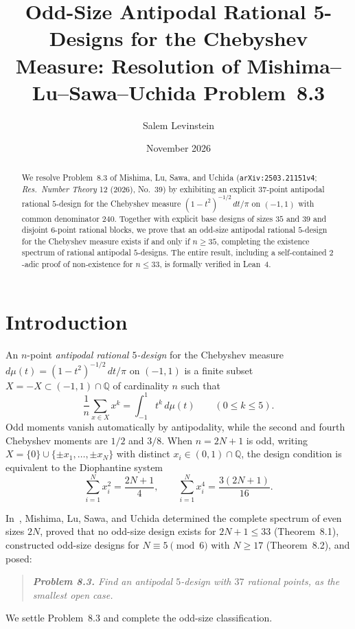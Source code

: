 \documentclass[11pt]{article}
\title{Odd-Size Antipodal Rational 5-Designs for the Chebyshev Measure: Resolution of Mishima--Lu--Sawa--Uchida Problem~8.3}
\author{Salem Levinstein}
\date{November 2026}
\begin{document}
\maketitle

\begin{abstract}
We resolve Problem~8.3 of Mishima, Lu, Sawa, and Uchida
(\texttt{arXiv:2503.21151v4}; \emph{Res.\ Number Theory} 12 (2026), No.~39) by
exhibiting an explicit $37$-point antipodal rational $5$-design for the
Chebyshev measure $(1-t^2)^{-1/2}\,dt/\pi$ on $(-1,1)$ with common denominator
$240$. Together with explicit base designs of sizes $35$ and $39$ and disjoint
$6$-point rational blocks, we prove that an odd-size antipodal rational
$5$-design for the Chebyshev measure exists if and only if $n \ge 35$,
completing the existence spectrum of rational antipodal $5$-designs. The entire
result, including a self-contained $2$-adic proof of non-existence for
$n \le 33$, is formally verified in Lean~4.
\end{abstract}

\section{Introduction}

An $n$-point \emph{antipodal rational $5$-design} for the Chebyshev measure
$d\mu(t) = (1 - t^2)^{-1/2}\,dt/\pi$ on $(-1, 1)$ is a finite subset
$X = -X \subset (-1, 1) \cap \mathbb{Q}$ of cardinality $n$ such that
\[
\frac{1}{n} \sum_{x \in X} x^k = \int_{-1}^{1} t^k\,d\mu(t)
\qquad (0 \le k \le 5).
\]
Odd moments vanish automatically by antipodality, while the second and fourth
Chebyshev moments are $1/2$ and $3/8$. When $n = 2N + 1$ is odd, writing
$X = \{0\} \cup \{\pm x_1, \dots, \pm x_N\}$ with distinct
$x_i \in (0, 1) \cap \mathbb{Q}$, the design condition is equivalent to the
Diophantine system
\begin{equation}\label{eq:hk}
\sum_{i=1}^{N} x_i^2 = \frac{2N + 1}{4},
\qquad
\sum_{i=1}^{N} x_i^4 = \frac{3(2N + 1)}{16}.
\end{equation}

In~\cite{MLSU2026}, Mishima, Lu, Sawa, and Uchida determined the complete
spectrum of even sizes $2N$, proved that no odd-size design exists for
$2N + 1 \le 33$ (Theorem~8.1), constructed odd-size designs for
$N \equiv 5 \pmod 6$ with $N \ge 17$ (Theorem~8.2), and posed:
\begin{quote}
\emph{\textbf{Problem 8.3.} Find an antipodal $5$-design with $37$ rational
points, as the smallest open case.}
\end{quote}
We settle Problem~8.3 and complete the odd-size classification.
\end{document}
